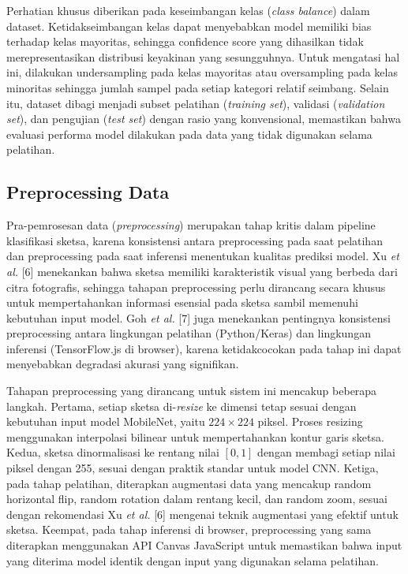 \documentclass[12pt,oneside]{report}
\begin{document}
Perhatian khusus diberikan pada keseimbangan kelas (\textit{class balance}) dalam dataset. Ketidakseimbangan kelas dapat menyebabkan model memiliki bias terhadap kelas mayoritas, sehingga confidence score yang dihasilkan tidak merepresentasikan distribusi keyakinan yang sesungguhnya. Untuk mengatasi hal ini, dilakukan undersampling pada kelas mayoritas atau oversampling pada kelas minoritas sehingga jumlah sampel pada setiap kategori relatif seimbang. Selain itu, dataset dibagi menjadi subset pelatihan (\textit{training set}), validasi (\textit{validation set}), dan pengujian (\textit{test set}) dengan rasio yang konvensional, memastikan bahwa evaluasi performa model dilakukan pada data yang tidak digunakan selama pelatihan.

\subsection{Preprocessing Data}
\label{subsec:preprocessing}

Pra-pemrosesan data (\textit{preprocessing}) merupakan tahap kritis dalam pipeline klasifikasi sketsa, karena konsistensi antara preprocessing pada saat pelatihan dan preprocessing pada saat inferensi menentukan kualitas prediksi model. Xu \textit{et al.} [6] menekankan bahwa sketsa memiliki karakteristik visual yang berbeda dari citra fotografis, sehingga tahapan preprocessing perlu dirancang secara khusus untuk mempertahankan informasi esensial pada sketsa sambil memenuhi kebutuhan input model. Goh \textit{et al.} [7] juga menekankan pentingnya konsistensi preprocessing antara lingkungan pelatihan (Python/Keras) dan lingkungan inferensi (TensorFlow.js di browser), karena ketidakcocokan pada tahap ini dapat menyebabkan degradasi akurasi yang signifikan.

Tahapan preprocessing yang dirancang untuk sistem ini mencakup beberapa langkah. Pertama, setiap sketsa di-\textit{resize} ke dimensi tetap sesuai dengan kebutuhan input model MobileNet, yaitu $224 \times 224$ piksel. Proses resizing menggunakan interpolasi bilinear untuk mempertahankan kontur garis sketsa. Kedua, sketsa dinormalisasi ke rentang nilai $[0, 1]$ dengan membagi setiap nilai piksel dengan 255, sesuai dengan praktik standar untuk model CNN. Ketiga, pada tahap pelatihan, diterapkan augmentasi data yang mencakup random horizontal flip, random rotation dalam rentang kecil, dan random zoom, sesuai dengan rekomendasi Xu \textit{et al.} [6] mengenai teknik augmentasi yang efektif untuk sketsa. Keempat, pada tahap inferensi di browser, preprocessing yang sama diterapkan menggunakan API Canvas JavaScript untuk memastikan bahwa input yang diterima model identik dengan input yang digunakan selama pelatihan.
\end{document}
